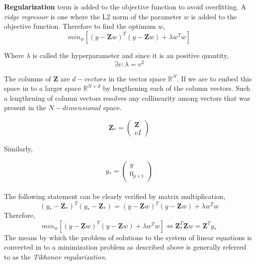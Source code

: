 \\
\\
\noindent \textbf{Regularization} term is added to the objective function to avoid overfitting. A \textit{ridge regressor} is one where the L2 norm of the parameter $w$ is added to the objective function. Therefore to find the optimum $w$,
\begin{equation*}
    min_w\left[(y - \mathbf{Z}w)^T (y - \mathbf{Z}w) + \lambda w^Tw \right] \tag{$\lambda \ge 0 $} 
\end{equation*}

 \noindent Where $\lambda$  is called the hyperparameter and since it is an positive quantity,
\begin{equation*}
    \exists v : \lambda = v^2
\end{equation*}
 
The columns of $\mathbf{Z}$ are $d-vectors$ in the vector space $\mathbb{R}^N$. If we are to embed this space in to a larger space $\mathbb{R}^{N+d}$ by lengthening each of the column vectors. Such a lengthening of column vectors resolves any collinearity among vectors that was present in the $N-dimensional$ space.

\begin{equation*}
    \mathbf{Z}_* = \begin{pmatrix}
               \mathbf{Z} \\
               vI
            \end{pmatrix}
\end{equation*}

Similarly,

\begin{equation*}
    y_* = \begin{pmatrix}
           y \\
           0_{p \times 1}
          \end{pmatrix} 
\end{equation*}
\\
The following statement can be clearly verified by matrix multiplication,
\begin{equation*}
    (y_* - \mathbf{Z}_*)^T(y_* - \mathbf{Z}_*) = (y - \mathbf{Z}w)^T (y - \mathbf{Z}w) + \lambda w^Tw
\end{equation*}
Therefore,
\begin{equation*}
     min_w\left[(y - \mathbf{Z}w)^T (y - \mathbf{Z}w) + \lambda w^Tw \right] \iff \mathbf{Z}_{*}^T\mathbf{Z}w = \mathbf{Z}^Ty_{*}
\end{equation*}
The means by which the problem of solutions to the system of linear equations is converted in to a minimization problem as described above is generally referred to as the \textit{Tikhonov regularization}.